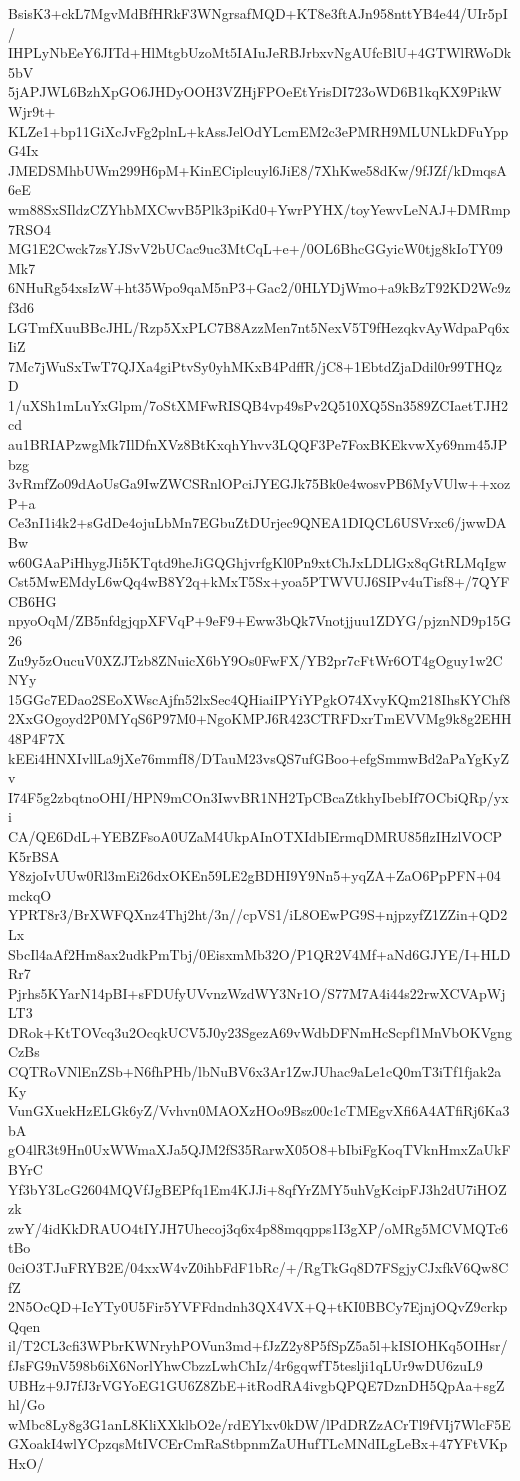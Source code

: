 BsisK3+ckL7MgvMdBfHRkF3WNgrsafMQD+KT8e3ftAJn958nttYB4e44/UIr5pI/
IHPLyNbEeY6JITd+HlMtgbUzoMt5IAIuJeRBJrbxvNgAUfcBlU+4GTWlRWoDk5bV
5jAPJWL6BzhXpGO6JHDyOOH3VZHjFPOeEtYrisDI723oWD6B1kqKX9PikWWjr9t+
KLZe1+bp11GiXcJvFg2plnL+kAssJelOdYLcmEM2c3ePMRH9MLUNLkDFuYppG4Ix
JMEDSMhbUWm299H6pM+KinECiplcuyl6JiE8/7XhKwe58dKw/9fJZf/kDmqsA6eE
wm88SxSIldzCZYhbMXCwvB5Plk3piKd0+YwrPYHX/toyYewvLeNAJ+DMRmp7RSO4
MG1E2Cwck7zsYJSvV2bUCac9uc3MtCqL+e+/0OL6BhcGGyicW0tjg8kIoTY09Mk7
6NHuRg54xsIzW+ht35Wpo9qaM5nP3+Gac2/0HLYDjWmo+a9kBzT92KD2Wc9zf3d6
LGTmfXuuBBcJHL/Rzp5XxPLC7B8AzzMen7nt5NexV5T9fHezqkvAyWdpaPq6xIiZ
7Mc7jWuSxTwT7QJXa4giPtvSy0yhMKxB4PdffR/jC8+1EbtdZjaDdil0r99THQzD
1/uXSh1mLuYxGlpm/7oStXMFwRISQB4vp49sPv2Q510XQ5Sn3589ZCIaetTJH2cd
au1BRIAPzwgMk7IlDfnXVz8BtKxqhYhvv3LQQF3Pe7FoxBKEkvwXy69nm45JPbzg
3vRmfZo09dAoUsGa9IwZWCSRnlOPciJYEGJk75Bk0e4wosvPB6MyVUlw++xozP+a
Ce3nI1i4k2+sGdDe4ojuLbMn7EGbuZtDUrjec9QNEA1DIQCL6USVrxc6/jwwDABw
w60GAaPiHhygJIi5KTqtd9heJiGQGhjvrfgKl0Pn9xtChJxLDLlGx8qGtRLMqIgw
Cst5MwEMdyL6wQq4wB8Y2q+kMxT5Sx+yoa5PTWVUJ6SIPv4uTisf8+/7QYFCB6HG
npyoOqM/ZB5nfdgjqpXFVqP+9eF9+Eww3bQk7Vnotjjuu1ZDYG/pjznND9p15G26
Zu9y5zOucuV0XZJTzb8ZNuicX6bY9Os0FwFX/YB2pr7cFtWr6OT4gOguy1w2CNYy
15GGc7EDao2SEoXWscAjfn52lxSec4QHiaiIPYiYPgkO74XvyKQm218IhsKYChf8
2XxGOgoyd2P0MYqS6P97M0+NgoKMPJ6R423CTRFDxrTmEVVMg9k8g2EHH48P4F7X
kEEi4HNXIvllLa9jXe76mmfI8/DTauM23vsQS7ufGBoo+efgSmmwBd2aPaYgKyZv
I74F5g2zbqtnoOHI/HPN9mCOn3IwvBR1NH2TpCBcaZtkhyIbebIf7OCbiQRp/yxi
CA/QE6DdL+YEBZFsoA0UZaM4UkpAInOTXIdbIErmqDMRU85flzIHzlVOCPK5rBSA
Y8zjoIvUUw0Rl3mEi26dxOKEn59LE2gBDHI9Y9Nn5+yqZA+ZaO6PpPFN+04mckqO
YPRT8r3/BrXWFQXnz4Thj2ht/3n//cpVS1/iL8OEwPG9S+njpzyfZ1ZZin+QD2Lx
SbcIl4aAf2Hm8ax2udkPmTbj/0EisxmMb32O/P1QR2V4Mf+aNd6GJYE/I+HLDRr7
Pjrhs5KYarN14pBI+sFDUfyUVvnzWzdWY3Nr1O/S77M7A4i44s22rwXCVApWjLT3
DRok+KtTOVcq3u2OcqkUCV5J0y23SgezA69vWdbDFNmHcScpf1MnVbOKVgngCzBs
CQTRoVNlEnZSb+N6fhPHb/lbNuBV6x3Ar1ZwJUhac9aLe1cQ0mT3iTf1fjak2aKy
VunGXuekHzELGk6yZ/Vvhvn0MAOXzHOo9Bsz00c1cTMEgvXfi6A4ATfiRj6Ka3bA
gO4lR3t9Hn0UxWWmaXJa5QJM2fS35RarwX05O8+bIbiFgKoqTVknHmxZaUkFBYrC
Yf3bY3LcG2604MQVfJgBEPfq1Em4KJJi+8qfYrZMY5uhVgKcipFJ3h2dU7iHOZzk
zwY/4idKkDRAUO4tIYJH7Uhecoj3q6x4p88mqqpps1I3gXP/oMRg5MCVMQTc6tBo
0ciO3TJuFRYB2E/04xxW4vZ0ihbFdF1bRc/+/RgTkGq8D7FSgjyCJxfkV6Qw8CfZ
2N5OcQD+IcYTy0U5Fir5YVFFdndnh3QX4VX+Q+tKI0BBCy7EjnjOQvZ9crkpQqen
il/T2CL3cfi3WPbrKWNryhPOVun3md+fJzZ2y8P5fSpZ5a5l+kISIOHKq5OIHsr/
fJsFG9nV598b6iX6NorlYhwCbzzLwhChIz/4r6gqwfT5teslji1qLUr9wDU6zuL9
UBHz+9J7fJ3rVGYoEG1GU6Z8ZbE+itRodRA4ivgbQPQE7DznDH5QpAa+sgZhl/Go
wMbc8Ly8g3G1anL8KliXXklbO2e/rdEYlxv0kDW/lPdDRZzACrTl9fVIj7WlcF5E
GXoakI4wlYCpzqsMtIVCErCmRaStbpnmZaUHufTLcMNdILgLeBx+47YFtVKpHxO/
